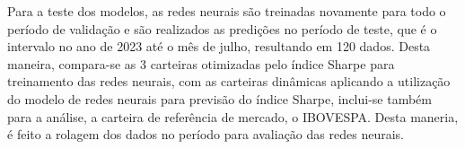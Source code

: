         \ipar Para a teste dos modelos, as redes neurais são treinadas novamente para todo o período de validação e são realizados as predições no período de teste, que é o intervalo no ano de 2023 até o mês de julho, resultando em 120 dados. Desta maneira, compara-se as 3 carteiras otimizadas pelo índice Sharpe para treinamento das redes neurais, com as carteiras dinâmicas aplicando a utilização do modelo de redes neurais para previsão do índice Sharpe, inclui-se também para a análise, a carteira de referência de mercado, o \acrshort{IBOVESPA}. Desta maneria, é feito a rolagem dos dados no período para avaliação das redes neurais.

\pagebreak
